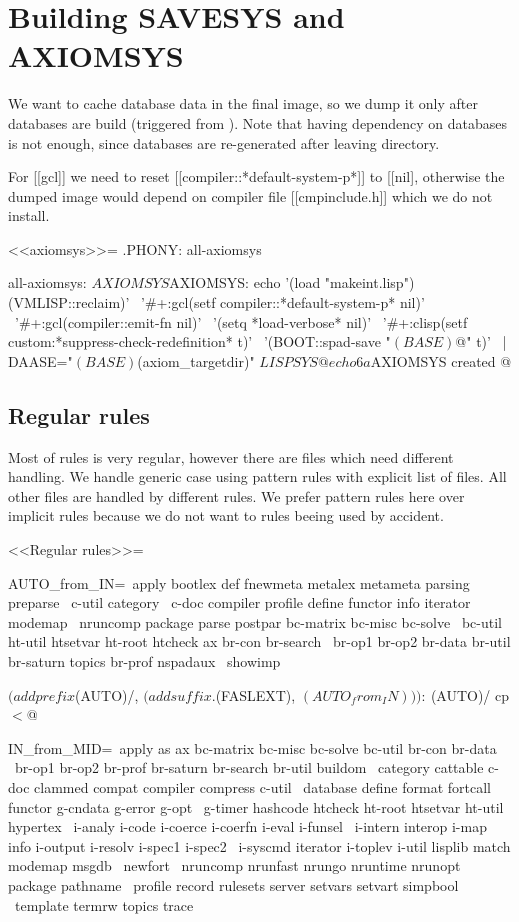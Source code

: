 \documentclass{article}
\begin{document}
\section{Building SAVESYS and AXIOMSYS}

We want to cache database data in the final image, so we dump it only
after databases are build (triggered from ).
Note that having dependency on databases is not enough, since databases
are re-generated after leaving  directory.

For [[gcl]] we need to reset [[compiler::*default-system-p*]] to [[nil],
otherwise the dumped image would depend on compiler file [[cmpinclude.h]]
which we do not install.

<<axiomsys>>=
.PHONY: all-axiomsys

all-axiomsys: ${AXIOMSYS}

${AXIOMSYS}:
	echo '(load "makeint.lisp") (VMLISP::reclaim)' \
	   '#+:gcl(setf compiler::*default-system-p* nil)' \
	   '#+:gcl(compiler::emit-fn nil)' \
           '(setq *load-verbose* nil)' \
           '#+:clisp(setf custom:*suppress-check-redefinition* t)' \
	   '(BOOT::spad-save "$(BASE)$@" t)' \
             | DAASE="$(BASE)$(axiom_targetdir)" ${LISPSYS}
	@ echo 6a ${AXIOMSYS} created
@

\subsection{Regular rules}

Most of rules is very regular, however there are files which need
different handling.  We handle generic case using  pattern rules with
explicit list of files.  All other files are handled by different rules.
We prefer pattern rules here over implicit rules because we do not
want to rules beeing used by accident.

<<Regular rules>>=

AUTO_from_IN=\
 apply bootlex def fnewmeta metalex metameta parsing preparse \
 c-util category \
 c-doc compiler profile define functor info iterator modemap \
 nruncomp package parse postpar bc-matrix bc-misc bc-solve \
 bc-util ht-util htsetvar ht-root htcheck ax br-con br-search \
 br-op1 br-op2 br-data br-util br-saturn topics br-prof nspadaux \
 showimp

$(addprefix $(AUTO)/, $(addsuffix .$(FASLEXT), $(AUTO_from_IN))): \
   $(AUTO)/%
	cp $< $@

IN_from_MID=\
 apply as ax bc-matrix bc-misc bc-solve bc-util br-con br-data \
 br-op1 br-op2 br-prof br-saturn br-search br-util buildom \
 category cattable c-doc clammed compat compiler compress c-util \
 database define format fortcall functor g-cndata g-error g-opt \
 g-timer hashcode htcheck ht-root htsetvar ht-util hypertex \
 i-analy i-code i-coerce i-coerfn i-eval i-funsel \
 i-intern interop i-map info i-output i-resolv i-spec1 i-spec2 \
 i-syscmd iterator i-toplev i-util lisplib match modemap msgdb \
 newfort \
 nruncomp nrunfast nrungo nruntime nrunopt package pathname \
 profile record rulesets server setvars setvart simpbool \
 template termrw topics trace
\end{document}
